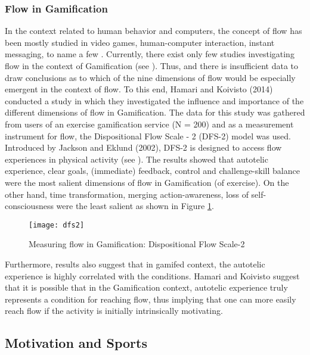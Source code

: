\subsubsection{Flow in Gamification}
In the context related to human behavior and computers, the concept of flow has been mostly studied in video games, human-computer interaction, instant messaging, to name a few \cite{hamari2014measuring}. Currently, there exist only few studies investigating flow in the context of Gamification (see \cite{hamari2014measuring, sillaots2014achieving}). Thus, and there is insufficient data to draw conclusions as to which of the nine dimensions of flow would be especially emergent in the context of flow. To this end, Hamari and Koivisto (2014) conducted a study in which they investigated the influence and importance of the different dimensions of flow in Gamification.  The data for this study was gathered from users of an exercise gamification service (N = 200) and as a measurement instrument for flow, the Dispositional Flow Scale - 2 (DFS-2) model was used. Introduced by Jackson and Eklund (2002), DFS-2 is designed to access flow experiences in physical activity (see \cite{jackson2002assessing}). The results showed that autotelic experience, clear goals, (immediate) feedback, control and challenge-skill balance were the most salient dimensions of flow in Gamification (of exercise). On the other hand, time transformation, merging action-awareness, loss of self-consciousness were the least salient as shown in Figure \ref{fig:dfs2}.
\begin{figure}[h]
    \centering
    \texttt{[image: dfs2]}
    \caption{Measuring flow in Gamification: Dispositional Flow Scale-2  \cite{dfs2}}
    \label{fig:dfs2}
\end{figure}
Furthermore, results also suggest that in gamifed context, the autotelic experience is highly correlated with the conditions. Hamari and Koivisto suggest that it is possible that in the Gamification context, autotelic experience truly represents a condition for reaching flow, thus implying that one can more easily reach flow if the activity is initially intrinsically motivating. 
\subsection{Motivation and Sports}

